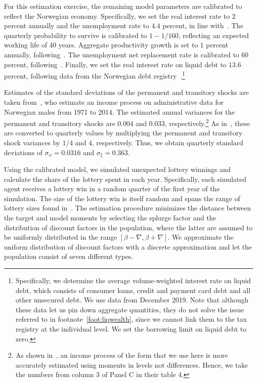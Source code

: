 \documentclass[qe]{econsocart}
\begin{document}
For this estimation exercise, the remaining model parameters are calibrated to reflect the Norwegian economy.
Specifically, we set the real interest rate to $2$ percent annually and the unemployment rate to $4.4$ percent, in line with~\cite{aursland-state-dependent-2020}.
The quarterly probability to survive is calibrated to $1-1/160$, reflecting an expected working life of 40 years.
Aggregate productivity growth is set to $1$ percent annually, following~\cite{kravik-navigating-2019}.
The unemployment net replacement rate is calibrated to $60$ percent, following~\cite{oecdReplacement}.
Finally, we set the real interest rate on liquid debt to $13.6$ percent, following data from the Norwegian debt registry~\cite{gjeldsregistret-nokkeltall-2022}.\footnote{Specifically, we determine the average volume-weighted interest rate on liquid debt, which consists of consumer loans, credit and payment card debt and all other unsecured debt.
  We use data from December 2019.
  Note that although these data let us pin down aggregate quantities, they do not solve the issue referred to in footnote~\ref{foot:liqwealth}, since we cannot link them to the tax registry at the individual level.
  We set the borrowing limit on liquid debt to zero.}

Estimates of the standard deviations of the permanent and transitory shocks are taken from~\cite{crawley2024Parsimonious}, who estimate an income process on administrative data for Norwegian males from 1971 to 2014.
The estimated annual variances for the permanent and transitory shocks are 0.004 and 0.033, respectively.\footnote{As shown in~\cite{crawley2024Parsimonious}, an income process of the form that we use here is more accurately estimated using moments in levels not differences.
  Hence, we take the numbers from column 3 of Panel C in their table 4.} As in~\cite{carroll2020sticky}, these are converted to quarterly values by multiplying the permanent and transitory shock variances by $1/4$ and $4$, respectively.
Thus, we obtain quarterly standard deviations of $\sigma_\psi=0.0316$ and $\sigma_\xi=0.363$.

Using the calibrated model, we simulated unexpected lottery winnings and calculate the share of the lottery spent in each year.
Specifically, each simulated agent receives a lottery win in a random quarter of the first year of the simulation.
The size of the lottery win is itself random and spans the range of lottery sizes found in~\cite{fagereng-mpc-2021}.
The estimation procedure minimizes the distance between the target and model moments by selecting the splurge factor and the distribution of discount factors in the population, where the latter are assumed to be uniformly distributed in the range $[\beta-\nabla, \beta+\nabla]$.
We approximate the uniform distribution of discount factors with a discrete approximation and let the population consist of seven different types.
\end{document}
